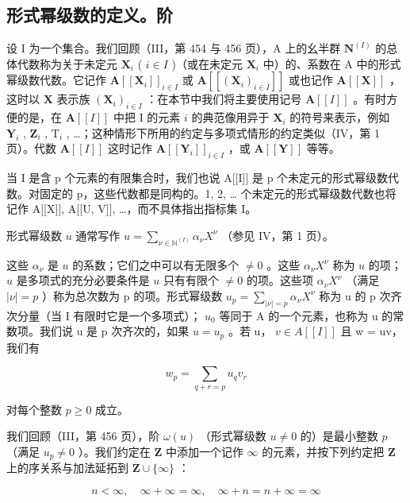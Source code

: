 \subsection{形式幂级数的定义。阶}

设 I 为一个集合。我们回顾（III，第 454 与 456 页），A 上的幺半群 \(\mathbf{N}^{(I)}\) 的总体代数称为关于未定元 \(\mathbf{X}_i\) ( \(i \in I\) )（或在未定元 \(\mathbf{X}_i\) 中）的、系数在 A 中的形式幂级数代数。它记作 \(\mathbf{A}[[\mathbf{X}_i]]_{i \in I}\) 或 \(\mathbf{A}[[(\mathbf{X}_i)_{i \in I}]]\) 或也记作 \(\mathbf{A}[[\mathbf{X}]]\) ，这时以 \(\mathbf{X}\) 表示族 \((\mathbf{X}_i)_{i \in I}\) ：在本节中我们将主要使用记号 \(\mathbf{A}[[I]]\) 。有时方便的是，在 \(\mathbf{A}[[I]]\) 中把 I 的元素 \(i\) 的典范像用异于 \(\mathbf{X}_i\) 的符号来表示，例如 \(\mathbf{Y}_i\) , \(\mathbf{Z}_i\) , \(\mathrm{T}_i\) , \ldots；这种情形下所用的约定与多项式情形的约定类似（IV，第 1 页）。代数 \(\mathbf{A}[[I]]\) 这时记作 \(\mathbf{A}[[\mathbf{Y}_i]]_{i \in I}\) ，或 \(\mathbf{A}[[\mathbf{Y}]]\) 等等。

当 I 是含 p 个元素的有限集合时，我们也说 A{[}{[}I{]}{]} 是 p 个未定元的形式幂级数代数。对固定的 p，这些代数都是同构的。1, 2, \ldots{} 个未定元的形式幂级数代数也将记作 A{[}{[}X{]}{]}, A{[}{[}U, V{]}{]}, \ldots，而不具体指出指标集 I。

形式幂级数 \(u\) 通常写作 \(u = \sum_{\nu \in \mathbb{N}^{(I)}} \alpha_{\nu} X^{\nu}\) （参见 IV，第 1 页）。

这些 \(\alpha_{\nu}\) 是 \(u\) 的系数；它们之中可以有无限多个 \(\neq 0\) 。这些 \(\alpha_{\nu}X^{\nu}\) 称为 \(u\) 的项； \(u\) 是多项式的充分必要条件是 \(u\) 只有有限个 \(\neq 0\) 的项。这些项 \(\alpha_{\nu}X^{\nu}\) （满足 \(|\nu|=p\) ）称为总次数为 p 的项。形式幂级数 \(u_{p}=\sum_{|\nu|=p}\alpha_{\nu}X^{\nu}\) 称为 u 的 p 次齐次分量（当 I 有限时它是一个多项式）； \(u_{0}\) 等同于 A 的一个元素，也称为 u 的常数项。我们说 u 是 p 次齐次的，如果 \(u = u_{p}\) 。若 u， \(v \in A[[I]]\) 且 w = uv，我们有

\[
w _ {p} = \sum_ {q + r = p} u _ {q} v _ {r}\tag{1}
\]

对每个整数 \(p \geqslant 0\) 成立。

我们回顾（III，第 456 页），阶 \(\omega(u)\) （形式幂级数 \(u \neq 0\) 的）是最小整数 \(p\) （满足 \(u_p \neq 0\) ）。我们约定在 \(\mathbf{Z}\) 中添加一个记作 \(\infty\) 的元素，并按下列约定把 \(\mathbf{Z}\) 上的序关系与加法延拓到 \(\mathbf{Z} \cup \{\infty\}\) ：

\[
n <   \infty , \quad \infty + \infty = \infty , \quad \infty + n = n + \infty = \infty
\]

